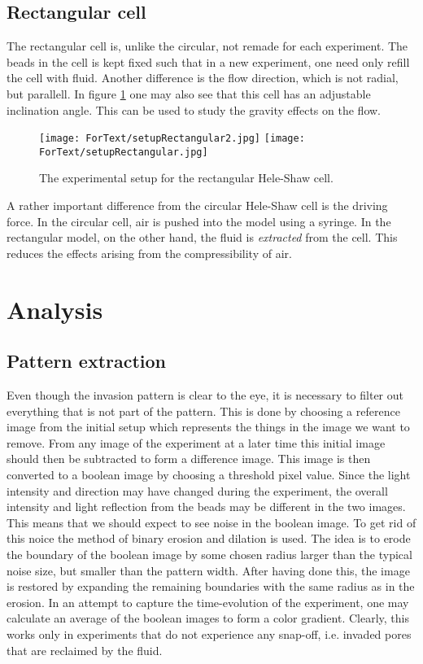 \documentclass[twoside,utf8]{article}
\begin{document}
\subsection{Rectangular cell}
The rectangular cell is, unlike the circular, not remade for each experiment. The beads in the cell is kept fixed such that in a new experiment, one need only refill the cell with fluid. Another difference is the flow direction, which is not radial, but parallell. In figure \ref{fig:setupRectangular} one may also see that this cell has an adjustable inclination angle. This can be used to study the gravity effects on the flow.

\begin{figure}[H]
	\begin{center}
	\texttt{[image: ForText/setupRectangular2.jpg]}
	\texttt{[image: ForText/setupRectangular.jpg]}
	\end{center}
	\caption{The experimental setup for the rectangular Hele-Shaw cell. }
	\label{fig:setupRectangular}
\end{figure}

\noindent
A rather important difference from the circular Hele-Shaw cell is the driving force. In the circular cell, air is pushed into the model using a syringe. In the rectangular model, on the other hand, the fluid is {\it extracted} from the cell. This reduces the effects arising from the compressibility of air.




\section{Analysis}

\subsection{Pattern extraction}
Even though the invasion pattern is clear to the eye, it is necessary to filter out everything that is not part of the pattern. This is done by choosing a reference image from the initial setup which represents the things in the image we want to remove. From any image of the experiment at a later time this initial image should then be subtracted to form a difference image. This image is then converted to a boolean image by choosing a threshold pixel value. Since the light intensity and direction may have changed during the experiment, the overall intensity and light reflection from the beads may be different in the two images. This means that we should expect to see noise in the boolean image. To get rid of this noice the method of binary erosion and dilation is used. The idea is to erode the boundary of the boolean image by some chosen radius larger than the typical noise size, but smaller than the pattern width. After having done this, the image is restored by expanding the remaining boundaries with the same radius as in the erosion. In an attempt to capture the time-evolution of the experiment, one may calculate an average of the boolean images to form a color gradient. Clearly, this works only in experiments that do not experience any snap-off, i.e. invaded pores that are reclaimed by the fluid.
\end{document}
